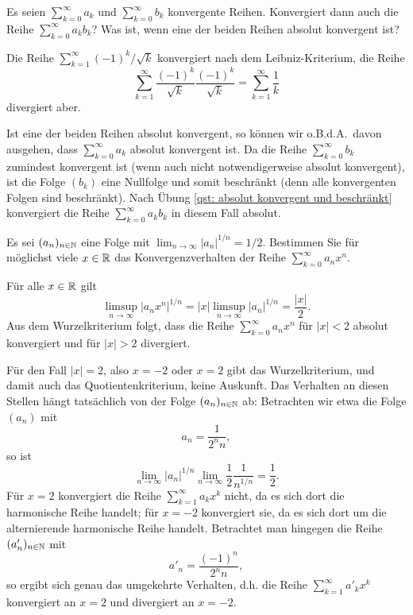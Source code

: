 \documentclass[a4paper,10pt]{article}
\begin{document}
\begin{question}
 Es seien $\sum_{k=0}^\infty a_k$ und $\sum_{k=0}^\infty b_k$ konvergente Reihen. Konvergiert dann auch die Reihe $\sum_{k=0}^\infty a_k b_k$? Was ist, wenn eine der beiden Reihen absolut konvergent ist?
\end{question}
\begin{solution}
 Die Reihe $\sum_{k=1}^\infty (-1)^k/\sqrt{k}$ konvergiert nach dem Leibniz-Kriterium, die Reihe
 \[
  \sum_{k=1}^\infty \frac{(-1)^k}{\sqrt{k}} \frac{(-1)^k}{\sqrt{k}}
  = \sum_{k=1}^\infty \frac{1}{k}
 \]
 divergiert aber.
 
 Ist eine der beiden Reihen absolut konvergent, so können wir o.B.d.A.\ davon ausgehen, dass $\sum_{k=0}^\infty a_k$ absolut konvergent ist. Da die Reihe $\sum_{k=0}^\infty b_k$ zumindest konvergent ist (wenn auch nicht notwendigerweise absolut konvergent), ist die Folge $(b_k)$ eine Nullfolge und somit beschränkt (denn alle konvergenten Folgen sind beschränkt). Nach Übung \ref{qst: absolut konvergent und beschränkt} konvergiert die Reihe $\sum_{k=0}^\infty a_k b_k$ in diesem Fall absolut.
\end{solution}



\begin{question}\label{qst: Konvergenzradius}
Es sei $(a_n)_{n \in \mathbb{N}}$ eine Folge mit $\lim_{n \to \infty} |a_n|^{1/n} = 1/2$. Bestimmen Sie für möglichst viele $x \in \mathbb{R}$ das Konvergenzverhalten der Reihe $\sum_{k=0}^\infty a_n x^n$.
\end{question}
\begin{solution}
 Für alle $x \in \mathbb{R}$ gilt
 \[
  \limsup_{n \to \infty} |a_n x^n|^{1/n}
  = |x| \limsup_{n \to \infty} |a_n|^{1/n}
  = \frac{|x|}{2}.
 \]
 Aus dem Wurzelkriterium folgt, dass die Reihe $\sum_{k=0}^\infty a_n x^n$ für $|x| < 2$ absolut konvergiert und für $|x| > 2$ divergiert.
 
 Für den Fall $|x| = 2$, also $x = -2$ oder $x = 2$ gibt das Wurzelkriterium, und damit auch das Quotientenkriterium, keine Auskunft. Das Verhalten an diesen Stellen hängt tatsächlich von der Folge $(a_n)_{n \in \mathbb{N}}$ ab: Betrachten wir etwa die Folge $(a_n)$ mit
 \[
  a_n = \frac{1}{2^n n},
 \]
 so ist
 \[
  \lim_{n \to \infty} |a_n|^{1/n}
  \lim_{n \to \infty} \frac{1}{2} \frac{1}{n^{1/n}}
  = \frac{1}{2}.
 \]
 Für $x = 2$ konvergiert die Reihe $\sum_{k=1}^\infty a_k x^k$ nicht, da es sich dort die harmonische Reihe handelt; für $x = -2$ konvergiert sie, da es sich dort um die alternierende harmonische Reihe handelt. Betrachtet man hingegen die Reihe $(a'_n)_{n \in \mathbb{N}}$ mit
 \[
  a'_n = \frac{(-1)^n}{2^n n},
 \]
 so ergibt sich genau das umgekehrte Verhalten, d.h. die Reihe $\sum_{k=1}^\infty a'_k x^k$ konvergiert an $x = 2$ und divergiert an $x = -2$.
\end{solution}
\end{document}
